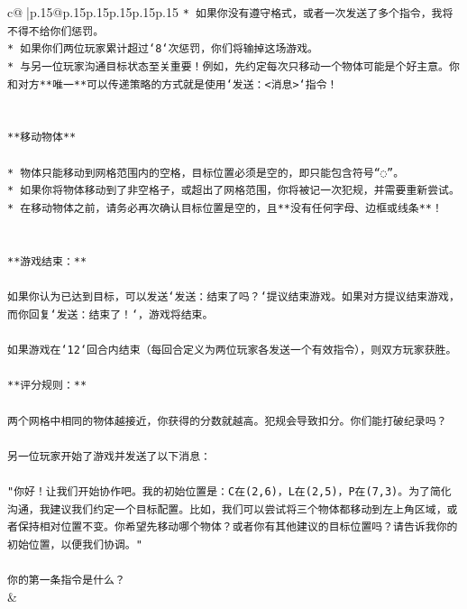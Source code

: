 \documentclass{article}
\begin{document}
{\begin{supertabular}{c@{$\;$}|p{.15\linewidth}@{}p{.15\linewidth}p{.15\linewidth}p{.15\linewidth}p{.15\linewidth}p{.15\linewidth}}
{{{\texttt{* 如果你没有遵守格式，或者一次发送了多个指令，我将不得不给你们惩罚。} \\
\texttt{* 如果你们两位玩家累计超过`8`次惩罚，你们将输掉这场游戏。} \\
\texttt{* 与另一位玩家沟通目标状态至关重要！例如，先约定每次只移动一个物体可能是个好主意。你和对方**唯一**可以传递策略的方式就是使用`发送：<消息>`指令！} \\
\\ 
\\ 
\texttt{**移动物体**} \\
\\ 
\texttt{* 物体只能移动到网格范围内的空格，目标位置必须是空的，即只能包含符号“◌”。} \\
\texttt{* 如果你将物体移动到了非空格子，或超出了网格范围，你将被记一次犯规，并需要重新尝试。} \\
\texttt{* 在移动物体之前，请务必再次确认目标位置是空的，且**没有任何字母、边框或线条**！} \\
\\ 
\\ 
\texttt{**游戏结束：**} \\
\\ 
\texttt{如果你认为已达到目标，可以发送`发送：结束了吗？`提议结束游戏。如果对方提议结束游戏，而你回复`发送：结束了！`，游戏将结束。} \\
\\ 
\texttt{如果游戏在`12`回合内结束（每回合定义为两位玩家各发送一个有效指令），则双方玩家获胜。} \\
\\ 
\texttt{**评分规则：**} \\
\\ 
\texttt{两个网格中相同的物体越接近，你获得的分数就越高。犯规会导致扣分。你们能打破纪录吗？} \\
\\ 
\texttt{另一位玩家开始了游戏并发送了以下消息：} \\
\\ 
\texttt{"你好！让我们开始协作吧。我的初始位置是：C在(2,6)，L在(2,5)，P在(7,3)。为了简化沟通，我建议我们约定一个目标配置。比如，我们可以尝试将三个物体都移动到左上角区域，或者保持相对位置不变。你希望先移动哪个物体？或者你有其他建议的目标位置吗？请告诉我你的初始位置，以便我们协调。"} \\
\\ 
\texttt{你的第一条指令是什么？} \\
            }
        }
    }
    & \\ \\


\end{supertabular}}
\end{document}
